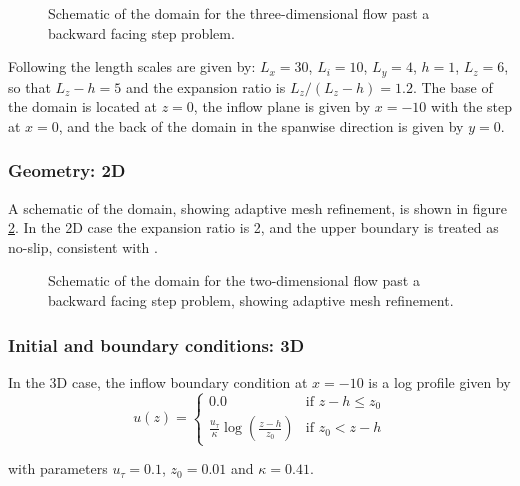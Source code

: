 \begin{figure}
\centering
{}
\caption{Schematic of the domain for the three-dimensional flow past a backward facing step
problem.}
\label{Fig:Schematic3d}
\end{figure}

Following \cite{le1997} the length scales are given by: $L_x=30$, $L_i=10$, $L_y=4$, $h=1$, $L_z=6$,
so that $L_z-h=5$ and the expansion ratio is $L_z/(L_z-h)=1.2$.
The base of the domain is located at $z=0$, the inflow plane is given by $x=-10$ with the step
at $x=0$, and the back of the domain in the spanwise direction is given by $y=0$.

\subsubsection{Geometry: 2D}
A schematic of the domain, showing adaptive mesh refinement, is shown in figure \ref{Fig:Schematic2d}.
In the 2D case the expansion ratio is 2, and the upper boundary is treated as no-slip,
consistent with \cite{armaly1983}.

\begin{figure}
\centering
{}
\caption{Schematic of the domain for the two-dimensional flow past a backward facing step
problem, showing adaptive mesh refinement.}
\label{Fig:Schematic2d}
\end{figure}


\subsubsection{Initial and boundary conditions: 3D}
In the 3D case, the inflow boundary condition at $x=-10$ is a log profile given by
\begin{equation*}
u(z) =
  \begin{cases}
    0.0 & \text{if } z-h \leq z_0 \\
    \frac{u_{\tau}}{\kappa} \log \left(\frac{z - h}{z_0}\right) & \text{if } z_0 < z-h
  \end{cases}
\end{equation*}

with parameters $u_{\tau} = 0.1$, $z_0 = 0.01$ and $\kappa = 0.41$.


